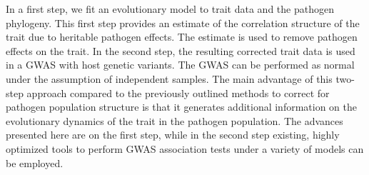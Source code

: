 \documentclass[11pt]{article}
\begin{document}
\begin{linenumbers}
In a first step, we fit an evolutionary model to trait data and the pathogen phylogeny. This first step provides an estimate of the correlation structure of the trait due to heritable pathogen effects. The estimate is used to remove pathogen effects on the trait. In the second step, the resulting corrected trait data is used in a GWAS with host genetic variants. The GWAS can be performed as normal under the assumption of independent samples. The main advantage of this two-step approach compared to the previously outlined methods to correct for pathogen population structure is that it generates additional information on the evolutionary dynamics of the trait in the pathogen population. The advances presented here are on the first step, while in the second step existing, highly optimized tools to perform GWAS association tests under a variety of models can be employed. 





\end{linenumbers}
\end{document}
